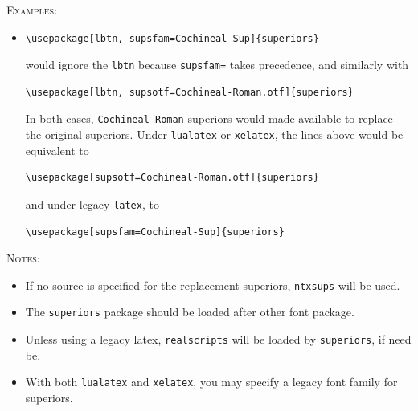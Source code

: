 \documentclass[11pt]{article}
\begin{document}
\textsc{Examples:}
\begin{itemize}
\item
\begin{verbatim}
\usepackage[lbtn, supsfam=Cochineal-Sup]{superiors}
\end{verbatim}
would ignore the {\tt lbtn} because {\tt supsfam=} takes precedence, and similarly with
\begin{verbatim}
\usepackage[lbtn, supsotf=Cochineal-Roman.otf]{superiors}
\end{verbatim}
In both cases, {\tt Cochineal-Roman} superiors would made available to replace the original superiors. Under {\tt lualatex} or {\tt xelatex}, the lines above would be equivalent to
\begin{verbatim}
\usepackage[supsotf=Cochineal-Roman.otf]{superiors}
\end{verbatim}
and under legacy {\tt latex}, to
\begin{verbatim}
\usepackage[supsfam=Cochineal-Sup]{superiors}
\end{verbatim}
\end{itemize}
\textsc{Notes:}
\begin{itemize}
\item
If no source is specified for the replacement superiors, {\tt ntxsups} will be used.
\item
The {\tt superiors} package should be loaded after other font package. 
\item Unless using a legacy latex, {\tt realscripts} will be loaded by {\tt superiors}, if need be.
\item With both {\tt lualatex} and {\tt xelatex}, you may specify a legacy font family for superiors.
\end{itemize}
\end{document}
